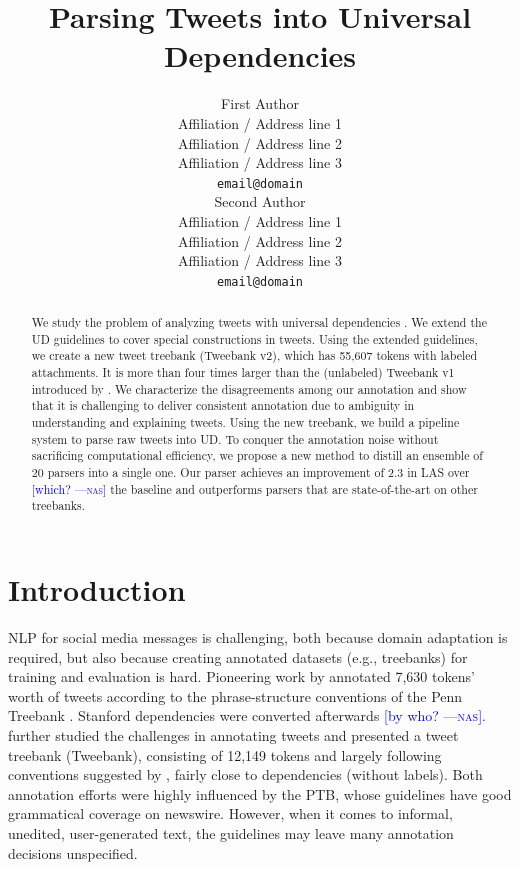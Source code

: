 \documentclass[11pt,a4paper]{article}
\title{Parsing Tweets into Universal Dependencies}
\author{First Author \\
  Affiliation / Address line 1 \\
  Affiliation / Address line 2 \\
  Affiliation / Address line 3 \\
  {\tt email@domain} \\\And
  Second Author \\
  Affiliation / Address line 1 \\
  Affiliation / Address line 2 \\
  Affiliation / Address line 3 \\
  {\tt email@domain} \\}
\date{}
\newcommand{\nascomment}[1]{\textcolor{blue}{[#1 ---\textsc{nas}]}}
\begin{document}
\maketitle
\begin{abstract}
We study the problem of analyzing tweets with
universal dependencies \citep[UD;][]{NIVRE16.348}. We extend the UD guidelines to cover
special constructions in tweets. Using the extended guidelines, we create
a new tweet treebank ({\sc Tweebank v2}), which has 55,607 tokens with
labeled attachments. 
It is more than four times larger than the (unlabeled) {\sc Tweebank
  v1} introduced by \citet{kong-EtAl:2014:EMNLP2014}. 
We characterize the disagreements
among our annotation and show that it is challenging to deliver
consistent annotation due to ambiguity in
understanding and explaining tweets. Using the new treebank,
we build a pipeline system to parse raw tweets into UD. To conquer the
annotation noise without sacrificing computational efficiency, we propose a new
method to distill an ensemble of 20 parsers into a single one. Our
parser achieves an improvement of 2.3 in LAS over \nascomment{which?} the baseline
and outperforms parsers that are state-of-the-art on other treebanks.
\end{abstract}

\section{Introduction}
NLP for social media messages is challenging, both because domain
adaptation is required, but also because creating annotated datasets
(e.g., treebanks)
for training and evaluation is hard. 
Pioneering work by \citet{AAAIW113912} 
annotated 7,630 tokens' worth of tweets according to the
phrase-structure conventions of the Penn Treebank \citep[PTB]{Marcus93buildinga}.
Stanford dependencies were converted afterwards \nascomment{by who?}. 
\citet{kong-EtAl:2014:EMNLP2014} further studied the challenges in
annotating tweets and presented a tweet treebank ({\sc Tweebank}),
consisting of 12,149 tokens and largely following conventions
suggested by \citet{schneider-EtAl:2013:LAW7-ID}, fairly close to 
\citet{Yamada03statisticaldependency} dependencies (without labels). 
Both annotation efforts were highly influenced by the PTB, whose guidelines
have  good grammatical coverage on newswire. However, when it comes
to informal, unedited, user-generated text, the guidelines may leave
many annotation decisions unspecified.
\end{document}
